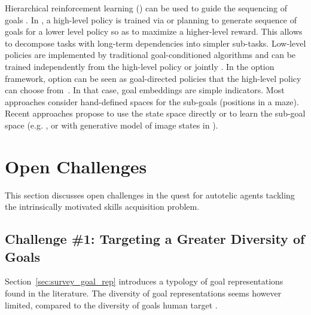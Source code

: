 Hierarchical reinforcement learning (\hrl) can be used to guide the sequencing of goals \cite{dayan1993feudal,sutton1998intra,sutton_between_1999,precup2001temporal}. In \hrl, a high-level policy is trained via \rl or planning to generate sequence of goals for a lower level policy so as to maximize a higher-level reward. This allows to decompose tasks with long-term dependencies into simpler sub-tasks. Low-level policies are implemented by traditional goal-conditioned \rl algorithms \cite{levy2018hierarchical,roder2020curious} and can be trained independently from the high-level policy \cite{kulkarni2016hierarchical,frans2017meta} or jointly \cite{levy2018hierarchical,nachum2018data,roder2020curious}. In the option framework, option can be seen as goal-directed policies that the high-level policy can choose from~\cite{sutton_between_1999,precup_temporal_2000}. In that case, goal embeddings are simple indicators. Most approaches consider hand-defined spaces for the sub-goals (\eg positions in a maze). Recent approaches propose to use the state space directly \cite{nachum2018data} or to learn the sub-goal space (e.g. \cite{vezhnevets2017feudal}, or with generative model of image states in  \cite{nasiriany2019planning}). 


\section{Open Challenges}
\label{sec:future}
This section discusses open challenges in the quest for autotelic agents tackling the intrinsically motivated skills acquisition problem. 

\subsection{Challenge \#1: Targeting a Greater Diversity of Goals}
\label{sec:future_diversity}
Section~\ref{sec:survey_goal_rep} introduces a typology of goal representations found in the literature. The diversity of goal representations seems however limited, compared to the diversity of goals human target \cite{ram1995goal}.

